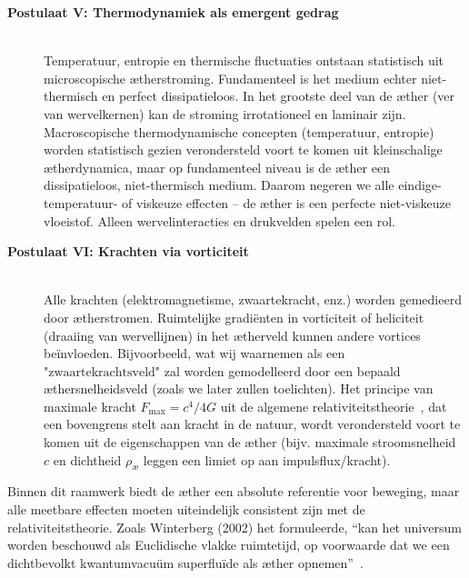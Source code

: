 \begin{description}
    \item[\textbf{Postulaat V: Thermodynamiek als emergent gedrag}] \hfill \\
    Temperatuur, entropie en thermische fluctuaties ontstaan statistisch uit microscopische ætherstroming. Fundamenteel is het medium echter niet-thermisch en perfect dissipatieloos. In het grootste deel van de æther (ver van wervelkernen) kan de stroming irrotationeel en laminair zijn. Macroscopische thermodynamische concepten (temperatuur, entropie) worden statistisch gezien verondersteld voort te komen uit kleinschalige ætherdynamica, maar op fundamenteel niveau is de æther een dissipatieloos, niet-thermisch medium. Daarom negeren we alle eindige-temperatuur- of viskeuze effecten – de æther is een perfecte niet-viskeuze vloeistof. Alleen wervelinteracties en drukvelden spelen een rol.

    \item[\textbf{Postulaat VI: Krachten via vorticiteit}] \hfill \\
    Alle krachten (elektromagnetisme, zwaartekracht, enz.) worden gemedieerd door ætherstromen.
    Ruimtelijke gradiënten in vorticiteit of heliciteit (draaiing van wervellijnen) in het ætherveld kunnen andere vortices beïnvloeden. Bijvoorbeeld, wat wij waarnemen als een $\text{"zwaartekrachtsveld"}$ zal worden gemodelleerd door een bepaald æthersnelheidsveld (zoals we later zullen toelichten). Het principe van maximale kracht $ F_\text{max} = c^4 / 4 G $ uit de algemene relativiteitstheorie~\cite{Schiller2022-maxforce}, dat een bovengrens stelt aan kracht in de natuur, wordt verondersteld voort te komen uit de eigenschappen van de æther (bijv. maximale stroomsnelheid $c$ en dichtheid $\rho_\text{\ae}$ leggen een limiet op aan impulsflux/kracht).
\end{description}



Binnen dit raamwerk biedt de æther een absolute referentie voor beweging, maar alle meetbare effecten moeten uiteindelijk consistent zijn met de relativiteitstheorie. Zoals Winterberg (2002) het formuleerde, ``kan het universum worden beschouwd als Euclidische vlakke ruimtetijd, op voorwaarde dat we een dichtbevolkt kwantumvacuüm superfluïde als æther opnemen''~\cite{Winterberg2002-PlanckÆther}.


